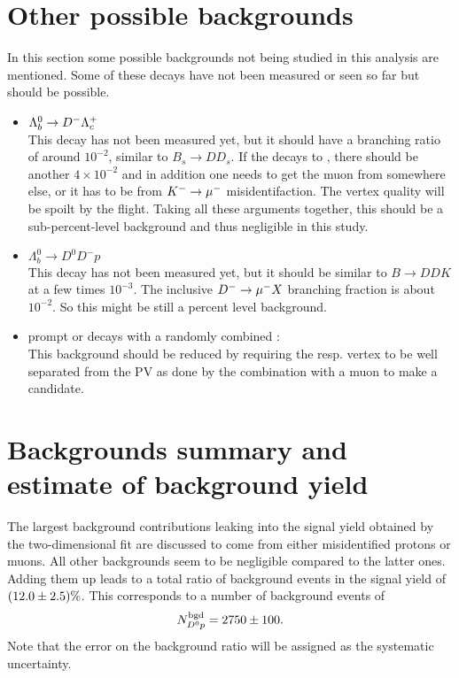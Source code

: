 \section{Other possible backgrounds}
In this section some possible backgrounds not being studied in this analysis are mentioned.
Some of these decays have not been measured or seen so far but should be possible.
\begin{itemize}
    \item $\Lambda_b^0 \rightarrow {\ensuremath{{D}^-}} {\ensuremath{{\Lambda}^+_{c}}}$ \\
          This decay has not been measured yet, but it should have a branching ratio of around $10^{-2}$, similar to $B_s \rightarrow D D_s$.
          If the \Lc decays to \pKpi, there should be another $4 \times 10^{-2}$ and in addition one needs to get the muon from somewhere else, or it has to be from ${{K}^-} \rightarrow {\ensuremath{\mu^-}}$ misidentifaction. 
          The vertex quality will be spoilt by the \Lc flight.
          Taking all these arguments together, this should be a sub-percent-level background and thus negligible in this study.
    \item $\Lambda_b^0 \rightarrow D^0 D^- p$ \\
          This decay has not been measured yet, but it should be similar to $B \rightarrow DDK$ at a few times $10^{-3}$.
          The inclusive ${{D}^-} \rightarrow {\ensuremath{\mu^-}} X$ branching fraction is about $10^{-2}$.
          So this might be still a percent level background.
    \item prompt \LcResI or \LcResII decays with a randomly combined \mun: \\
          This background should be reduced by requiring the \LcResI resp. \LcResII vertex to be well separated from the PV as done by the combination with a muon to make a \Lb candidate.
\end{itemize}

\section{Backgrounds summary and estimate of background yield}
The largest background contributions leaking into the signal yield \NDp obtained by the two-dimensional fit are discussed to come from either misidentified protons or muons.
All other backgrounds seem to be negligible compared to the latter ones.
Adding them up leads to a total ratio of background events in the signal yield of $(12.0 \pm 2.5)\%$.
This corresponds to a number of background events of 
\begin{align*}
    N^{\rm bgd}_{{{D}^0}{p}} = 2750 \pm 100.
\end{align*}
Note that the error on the background ratio will be assigned as the systematic uncertainty.

